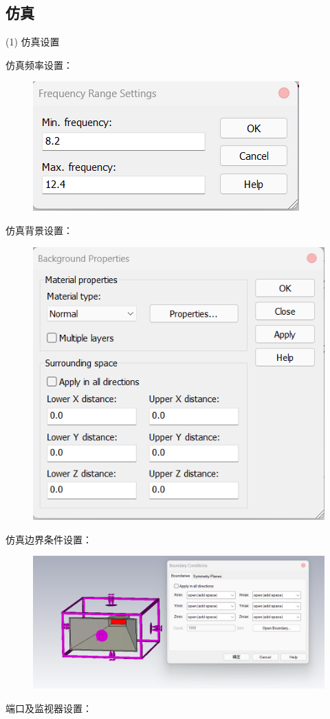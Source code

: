 \documentclass{source/Report}
\begin{document}
\subsection{仿真}
(1) 仿真设置\par
仿真频率设置：
\begin{figure}[H]
    \begin{center}
        \includegraphics[width=0.35\linewidth]{pic/cb2_p8.png}
        \caption{}
    \end{center}
\end{figure}
仿真背景设置：
\begin{figure}[H]
    \begin{center}
        \includegraphics[width=0.4\linewidth]{pic/cb2_p9.png}
        \caption{}
    \end{center}
\end{figure}
仿真边界条件设置：
\begin{figure}[H]
    \begin{center}
        \includegraphics[width=0.8\linewidth]{pic/cb2_p10.png}
        \caption{}
    \end{center}
\end{figure}
端口及监视器设置：
\end{document}
